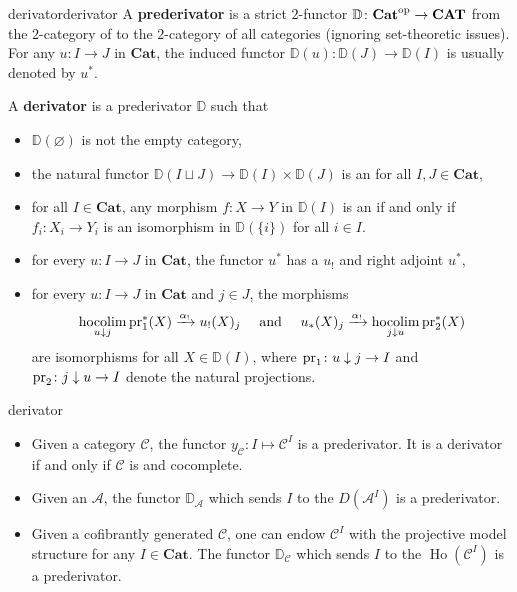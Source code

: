 \begin{topic}{derivator}{derivator}
    A \textbf{prederivator} is a strict $2$-functor $\mathbb{D} \colon \textbf{Cat}^\textup{op} \to \textbf{CAT}$ from the $2$-category of  to the $2$-category of all categories (ignoring set-theoretic issues). For any $u \colon I \to J$ in $\textbf{Cat}$, the induced functor $\mathbb{D}(u) \colon \mathbb{D}(J) \to \mathbb{D}(I)$ is usually denoted by $u^*$.

    A \textbf{derivator} is a prederivator $\mathbb{D}$ such that
    \begin{itemize}
        \item $\mathbb{D}(\varnothing)$ is not the empty category,
        \item the natural functor $\mathbb{D}(I \sqcup J) \to \mathbb{D}(I) \times \mathbb{D}(J)$ is an  for all $I, J \in \textbf{Cat}$,
        \item for all $I \in \textbf{Cat}$, any morphism $f \colon X \to Y$ in $\mathbb{D}(I)$ is an  if and only if $f_i \colon X_i \to Y_i$ is an isomorphism in $\mathbb{D}(\{ i \})$ for all $i \in I$.
        \item for every $u \colon I \to J$ in $\textbf{Cat}$, the functor $u^*$ has a  $u_!$ and right adjoint $u^*$,
        \item for every $u \colon I \to J$ in $\textbf{Cat}$ and $j \in J$, the morphisms
        \[ \operatorname*{hocolim}_{u \downarrow j} \textup{pr}_1^*(X) \xrightarrow{\alpha_!} u_!(X)_j \quad \textup{ and } \quad u_*(X)_j \xrightarrow{\alpha_!} \operatorname*{hocolim}_{j \downarrow u} \textup{pr}_2^*(X) \]
        are isomorphisms for all $X \in \mathbb{D}(I)$, where $\textup{pr}_1 \colon u \downarrow j \to I$ and $\textup{pr}_2 \colon j \downarrow u \to I$ denote the natural projections.
    \end{itemize}
\end{topic}

\begin{example}{derivator}
    \begin{itemize}
        \item Given a category $\mathcal{C}$, the functor $y_\mathcal{C} \colon I \mapsto \mathcal{C}^I$ is a prederivator. It is a derivator if and only if $\mathcal{C}$ is  and cocomplete.
        \item Given an  $\mathcal{A}$, the functor $\mathbb{D}_\mathcal{A}$ which sends $I$ to the  $D(\mathcal{A}^I)$ is a prederivator.
        \item Given a cofibrantly generated  $\mathcal{C}$, one can endow $\mathcal{C}^I$ with the projective model structure for any $I \in \textbf{Cat}$. The functor $\mathbb{D}_\mathcal{C}$ which sends $I$ to the  $\operatorname{Ho}(\mathcal{C}^I)$ is a prederivator.
    \end{itemize}
\end{example}

